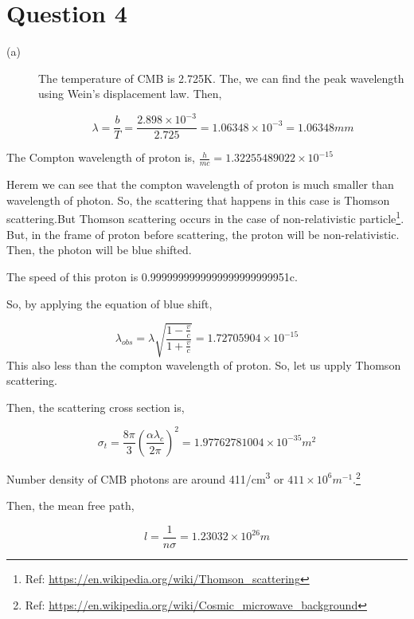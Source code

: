 \documentclass[a4paper,12pt]{article}
\begin{document}
\section*{Question 4}
\label{sec:org39857dd}

\begin{description}
\item[{(a)}] The temperature of CMB is 2.725K. The, we can find the peak wavelength using Wein's displacement law. Then,

$$\lambda = \frac{b}{T} = \frac{2.898\times 10^{-3}}{2.725} = 1.06348\times 10^{-3} = 1.06348 mm$$
\end{description}
The Compton wavelength of proton is, \(\frac{h}{mc} = 1.32255489022\times 10^{-15}\)

Herem we can see that the compton wavelength of proton is much smaller than wavelength of photon. So, the scattering that happens in this case is Thomson scattering.But Thomson scattering occurs in the case of non-relativistic particle\footnote{Ref: \url{https://en.wikipedia.org/wiki/Thomson\_scattering}}. But, in the frame of proton before scattering, the proton will be non-relativistic. Then, the photon will be blue shifted.

The speed of this proton is 0.9999999999999999999999951c.

So, by applying the equation of blue shift,

$$\lambda_{obs} = \lambda \sqrt{\frac{1-\frac{v}{c}}{1+\frac{v}{c}}} = 1.72705904\times 10^{-15}$$
This also less than the compton wavelength of proton. So, let us upply Thomson scattering.

Then, the scattering cross section is,

$$\sigma_t = \frac{8\pi}{3}\left(\frac{\alpha \lambda_c}{2\pi}\right)^2 = 1.97762781004\times 10^{-35} m^2$$

Number density of CMB photons are around 411/cm\textsuperscript{3} or \(411\times 10^6 m^{-1}\).\footnote{Ref: \url{https://en.wikipedia.org/wiki/Cosmic\_microwave\_background}}

Then, the mean free path,

$$l = \frac{1}{n\sigma} = 1.23032 \times 10^{26} m$$
\end{document}
